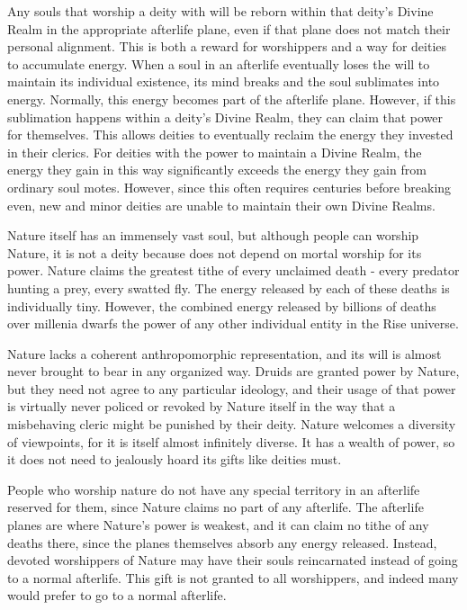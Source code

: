       Any souls that worship a deity with will be reborn within that deity's Divine Realm in the appropriate afterlife plane, even if that plane does not match their personal alignment.
      This is both a reward for worshippers and a way for deities to accumulate energy.
      When a soul in an afterlife eventually loses the will to maintain its individual existence, its mind breaks and the soul sublimates into energy.
      Normally, this energy becomes part of the afterlife plane.
      However, if this sublimation happens within a deity's Divine Realm, they can claim that power for themselves.
      This allows deities to eventually reclaim the energy they invested in their clerics.
      For deities with the power to maintain a Divine Realm, the energy they gain in this way significantly exceeds the energy they gain from ordinary soul motes.
      However, since this often requires centuries before breaking even, new and minor deities are unable to maintain their own Divine Realms.

      Nature itself has an immensely vast soul, but although people can worship Nature, it is not a deity because does not depend on mortal worship for its power.
      Nature claims the greatest tithe of every unclaimed death - every predator hunting a prey, every swatted fly.
      The energy released by each of these deaths is individually tiny.
      However, the combined energy released by billions of deaths over millenia dwarfs the power of any other individual entity in the Rise universe.

      Nature lacks a coherent anthropomorphic representation, and its will is almost never brought to bear in any organized way.
      Druids are granted power by Nature, but they need not agree to any particular ideology, and their usage of that power is virtually never policed or revoked by Nature itself in the way that a misbehaving cleric might be punished by their deity.
      Nature welcomes a diversity of viewpoints, for it is itself almost infinitely diverse.
      It has a wealth of power, so it does not need to jealously hoard its gifts like deities must.

      People who worship nature do not have any special territory in an afterlife reserved for them, since Nature claims no part of any afterlife.
      The afterlife planes are where Nature's power is weakest, and it can claim no tithe of any deaths there, since the planes themselves absorb any energy released.
      Instead, devoted worshippers of Nature may have their souls reincarnated instead of going to a normal afterlife.
      This gift is not granted to all worshippers, and indeed many would prefer to go to a normal afterlife.

